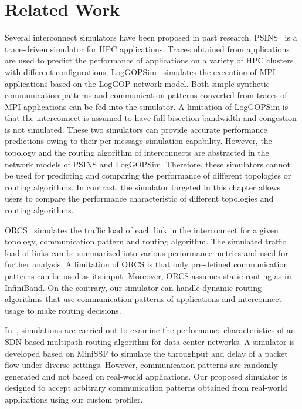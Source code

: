 \section{Related Work}\label{sec:ii-related-work}

Several interconnect simulators have been proposed in past research.
PSINS~\autocite{Tikir2009} is a trace-driven simulator for HPC
applications. Traces obtained from applications are used to predict the
performance of applications on a variety of HPC clusters with different
configurations. LogGOPSim~\autocite{Hoefler2010} simulates the execution
of MPI applications based on the LogGOP network model. Both simple
synthetic communication patterns and communication patterns converted
from traces of MPI applications can be fed into the simulator. A
limitation of LogGOPSim is that the interconnect is assumed to have full
bisection bandwidth and congestion is not simulated. These two
simulators can provide accurate performance predictions owing to their
per-message simulation capability. However, the topology and the routing
algorithm of interconnects are abstracted in the network models of PSINS
and LogGOPSim. Therefore, these simulators cannot be used for predicting
and comparing the performance of different topologies or routing
algorithms. In contrast, the simulator targeted in this chapter allows
users to compare the performance characteristic of different topologies
and routing algorithms.

ORCS~\autocite{Schneider2009} simulates the traffic load of each link in
the interconnect for a given topology, communication pattern and routing
algorithm. The simulated traffic load of links can be summarized into
various performance metrics and used for further analysis. A limitation
of ORCS is that only pre-defined communication patterns can be used as
its input. Moreover, ORCS assumes static routing as in InfiniBand. On
the contrary, our simulator can handle dynamic routing algorithms that
use communication patterns of applications and interconnect usage to
make routing decisions.

In~\autocite{Jo2015}, simulations are carried out to examine the
performance characteristics of an SDN-based multipath routing algorithm
for data center networks. A simulator is developed based on MiniSSF to
simulate the throughput and delay of a packet flow under diverse
settings. However, communication patterns are randomly generated and not
based on real-world applications. Our proposed simulator is designed to
accept arbitrary communication patterns obtained from real-world
applications using our custom profiler.

